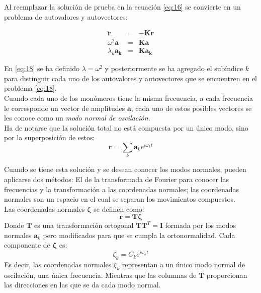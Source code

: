 Al reemplazar la soluci\'{o}n de prueba en la ecuaci\'{o}n \eqref{eq:16} se convierte en un problema de autovalores y autovectores:

\begin{eqnarray}\label{eq:18}
\ddot{\mathbf{r}}&=&-\mathbf{K}\mathbf{r} \nonumber \\
\omega^2\mathbf{a}&=&\mathbf{K}\mathbf{a} \nonumber \\
\lambda_{k}\mathbf{a_{k}}&=&\mathbf{K}\mathbf{a_{k}}
\end{eqnarray}

En \eqref{eq:18} se ha definido $\lambda=\omega^2$ y posteriormente se ha agregado el sub\'{i}ndice $k$ para distinguir cada uno de los autovalores y autovectores que se encuentren en el problema \eqref{eq:18}.\\
Cuando cada uno de los mon\'{o}meros tiene la misma frecuencia, a cada frecuencia le corresponde un vector de amplitudes $\mathbf{a}$, cada uno de estos posibles vectores se les conoce como un \textit{modo normal de oscilaci\'{o}n}.\\

Ha de notarse que la soluci\'{o}n total no est\'{a} compuesta por un \'{u}nico modo, sino por la superposici\'{o}n de estos:
\begin{equation}\label{eq:tot}
\mathbf{r}=\sum_k\mathbf{a}_ke^{i\omega_k t}
\end{equation}

Cuando se tiene esta soluci\'{o}n y se desean conocer los modos normales, pueden aplicarse dos m\'{e}todos: El de la transformada de Fourier para conocer las frecuencias y la transformaci\'{o}n a las coordenadas normales; las coordenadas normales son un espacio en el cual se separan los movimientos compuestos.\\

Las coordenadas normales $\mathbf{\zeta}$ se definen como:
\begin{equation}
\mathbf{r}=\mathbf{T}\mathbf{\zeta}
\end{equation}
Donde $\mathbf{T}$ es una transformaci\'{o}n ortogonal  $\mathbf{T}\mathbf{T}^T=\mathbf{I}$ formada por los modos normales $\mathbf{a}_k$  pero modificados para que se cumpla la ortonormalidad. Cada componente de $\mathbf{\zeta}$ es:
\begin{equation}\label{eq:nor}
\zeta_k=C_k e^{i\omega_k t}
\end{equation}
Es decir, las coordenadas normales $\zeta_k$ representan a un \'{u}nico modo normal de oscilaci\'{o}n, una \'{u}nica frecuencia. Mientras que las columnas de $\mathbf{T}$ proporcionan las direcciones en las que se da cada modo normal.\\


